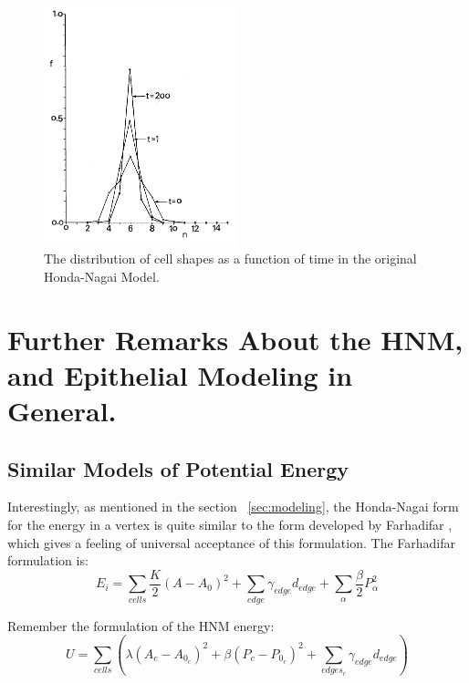 \begin{figure}[ht]
\includegraphics[width=0.5\textwidth]{../diagrams/distibutionHonda.png}
\caption[Distribution of Cell Shapes]{The distribution of cell shapes as a function of time \cite{HondaNagai} in the original Honda-Nagai Model.}
\end{figure}

\section{Further Remarks About the HNM, and Epithelial Modeling in General.}
\subsection{Similar Models of Potential Energy}
Interestingly, as mentioned in the section ~\ref{sec:modeling}, the Honda-Nagai form for the energy in a vertex is quite similar to the form developed by Farhadifar \cite{Farhadifar}, which gives a feeling of universal acceptance of this formulation. The Farhadifar formulation is:
\begin{equation}
E_i = \sum\limits_{cells}\frac K2(A - A_0)^2 + \sum\limits_{edge}\gamma_{edge}d_{edge} + \sum\limits_{\alpha}\frac\beta2P_\alpha^2
\end{equation}

Remember the formulation of the HNM energy:
\begin{equation*}
U = \sum\limits_{cells}\left(\lambda(A_c - A_{0_c})^2 + \beta(P_c - P_{0_c})^2 + \sum_{edges_c}\gamma_{edge}d_{edge}\right)
\end{equation*}


